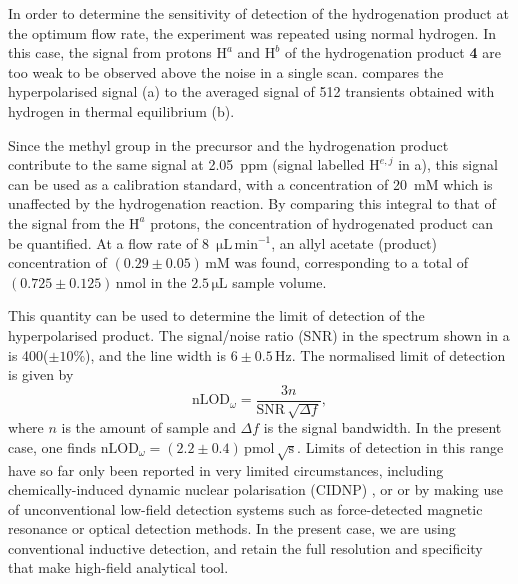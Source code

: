 In order to determine the sensitivity of detection of the hydrogenation product
at the optimum flow rate, the experiment was repeated using normal hydrogen.
In this case, the signal from  protons $\mathrm{H}^a$ and $\mathrm{H}^b$
of the hydrogenation product \textbf{4}
are too weak to be observed above the noise in a single scan.
compares the hyperpolarised signal (a) to the averaged signal of 512 transients
obtained with hydrogen in thermal equilibrium (b).

Since the methyl group in the
precursor and the hydrogenation product contribute to the same signal at 2.05~ppm
(signal labelled $\mathrm{H}^{e,j}$ in a),
this signal can be used as a calibration standard, with a concentration of 20~mM
which is unaffected by the hydrogenation reaction. By comparing this integral to that
of the signal from the $\mathrm{H}^a$ protons, the concentration
of hydrogenated product can be
quantified. At a flow rate of 8~$\mathrm{\mu L\,\text{min}^{-1}}$, an allyl acetate
(product) concentration of $(0.29\pm 0.05)\,\mathrm{mM}$ was found, corresponding to a total
of $(0.725\pm0.125)\,\text{nmol}$ in the $2.5\,\mathrm{\mu L}$ sample volume.



This quantity can be used to determine the limit of detection of the
hyperpolarised product. The signal/noise ratio (SNR) in the spectrum shown in
a is 400($\pm 10\%$), and the line width is $6\pm
0.5\,\text{Hz}$. The normalised limit of detection is given by \[
\text{nLOD}_\omega = \frac{3 n}{\text{SNR}\,\sqrt{\Delta f}}, \] where $n$ is
the amount of sample and $\Delta f$ is the signal bandwidth. In the present
case, one finds $\text{nLOD}_\omega = (2.2\pm
0.4)\,\text{pmol}\,\sqrt{\text{s}}$. Limits of detection in this range have so
far only been reported in very limited circumstances, including
chemically-induced dynamic nuclear polarisation (CIDNP)
\cite{mompean2018pushing}, or or by making use of unconventional low-field
detection systems
such as force-detected magnetic resonance or optical detection methods\cite{Rugar:1992dm,Rugar:2004bc,Mamin:2007ff,Poggio:2010jf,
Maze:2008cs,Staudacher:2013kn,Rugar:2015by,McDermott:2002hp,
Budker:2007hz,Xu:2006kg,Blanchard:2013gs}. In the
present case, we are using conventional inductive detection, and retain the full
resolution and specificity that make high-field
analytical tool.


